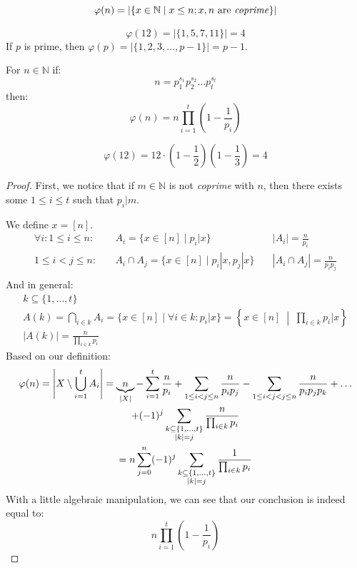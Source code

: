 \documentclass[00_complete]{subfiles}
\begin{document}
\begin{definition}
    $$\varphi(n) = |\{x \in \mathbb{N} \mid x \leq n;
        x,n \text{ are \emph{coprime}}\}|
    $$
\begin{example}
    $$\varphi(12)=|\{1,5,7,11\}|=4$$
    If $p$ is prime, then $\varphi(p)=|\{1,2,3,\dots,p-1\}|=p-1$.
\end{example}
\end{definition}
\begin{theorem}
    For $n \in \mathbb{N}$ if:
    $$n=p_1^{s_1}p_2^{s_2}\dots p_t^{s_t}$$
    then:
    $$\varphi(n)=n\prod_{i=1}^t\left(1-\frac{1}{p_i}\right)$$
    \begin{example}
        $$\varphi(12)=12\cdot\left(1-\frac{1}{2}\right)\left(1-\frac{1}{3}\right)=4$$
    \end{example}
\end{theorem}
\begin{proof}
    First, we notice that if $m \in \mathbb{N}$ is not \emph{coprime} with $n$, then there
    exists some $1\leq i \leq t$ such that $p_i|m$.

    We define $x=[n]$.
    \begin{align*}
        \forall i: 1 \leq i \leq n:
        \quad &A_i = \{x \in [n] \mid p_i|x \} \quad&|A_i|=\frac{n}{p_i} \\
        1 \leq i<j\leq n:
        \quad &A_i\cap A_j = \{x \in [n] \mid p_i|x, p_j|x \}  \quad &|A_i \cap A_j| =\frac{n}{p_ip_j} \\
    \end{align*}
    And in general:
    \begin{gather*}
        k \subseteq \{1,\dots,t\} \\
        A(k)=\bigcap_{i \in k}A_i = \{x \in [n] \mid \forall i \in k: p_i|x\}
        = \left\{x \in [n] \;\middle|\; \prod_{i \in k}p_i|x\right\} \\
        |A(k)| = \frac{n}{\prod_{i \in k}p_i}
    \end{gather*}
    Based on our definition:
    \begin{gather*}
        \varphi(n) = \left|X \setminus \bigcup_{i=1}^tA_i\right|
        = \underbrace{n}_{|X|}-\sum_{i=1}^{t}\frac{n}{p_i}+\sum_{1\leq i<j\leq
        n}\frac{n}{p_ip_j}-\sum_{1\leq i<j<j\leq n}\frac{n}{p_ip_jp_k}+\dots\\
        +(-1)^j\sum_{\begin{subarray}{c}k \subseteq
        \{1,\dots,t\}\\|k|=j\end{subarray}}\frac{n}{\prod_{i \in k}p_i}\\
        =n\sum_{j=0}^{n}(-1)^j\sum_{\begin{subarray}{c}k \subseteq
        \{1,\dots,t\}\\|k|=j\end{subarray}}\frac{1}{\prod_{i \in k}p_i}
    \end{gather*}
    With a little algebraic manipulation, we can see that our conclusion is
    indeed equal to:
    $$n\prod_{i=1}^t\left(1-\frac{1}{p_i}\right)$$
\end{proof}
\end{document}
